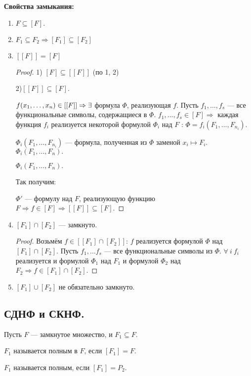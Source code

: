 \textbf{Свойства замыкания:}
\begin{enumerate}
	\item $F \subseteq [F].$
	\item $F_1 \subseteq F_2 \Longrightarrow [F_1] \subseteq [F_2]$
	\item $[[F]] = [F]$
	\begin{proof}
		1) $[F] \subseteq [[F]]$ (по 1, 2)

		2)$[[F]] \subseteq [F]$.

		$f(x_1, \ldots, x_n) \in [[F]] \Rightarrow \exists$ формула $\Phi$, реализующая $f$. Пусть $f_1, \ldots, f_s$ --- все функциональные символы, содержащиеся в $\Phi$. $f_1, \ldots, f_s \in [F] \Rightarrow $ каждая функция $f_i$ реализуется некоторой формулой $\Phi_i$ над $F$ : $\Phi = f_i(F_1, \ldots, F_{n_i})$.

		$\Phi_i(F_1, \ldots, F_{n_i})$ --- формула, полученная из $\Phi$ заменой $x_i \longmapsto F_i$. $\Phi_i(F_1, \ldots, F_n).$

		$\Phi_i(F_1, \ldots, F_n).$

		Так получим: 

		$\Phi'$ --- формулу над $F$, реализующую функцию $F \Rightarrow f \in [F] \Rightarrow [[F]] \subseteq [F]$.
	\end{proof}
	\item  $[F_1] \cap [F_2]$ --- замкнуто.
	\begin{proof}
		Возьмём $f \in [[F_1] \cap [F_2]]$: $f$ реализуется формулой $\Phi$ над $[F_1] \cap [F_2]$. Пусть $f_1, \ldots f_s$ --- все функциональные символы из $\Phi$. $\forall \: i \: f_i$ реализуется и формулой $\Phi_1$ над $F_1$ и формулой $\Phi_2$ над $F_2 \Rightarrow f \in  [F_1] \cap [F_2]$.
	\end{proof}
	\item  $[F_1] \cup [F_2]$ не обязательно замкнуто.
\end{enumerate}

\subsection{СДНФ и СКНФ.}
Пусть $F$ --- замкнутое множество, и $F_1 \subseteq F$.

\begin{definition}
	$F_1$ называется полным в $F$, если $[F_1] = F$.
\end{definition}

\begin{definition}
	$F_1$ называется полным, если $[F_1] = P_2$.
\end{definition}

